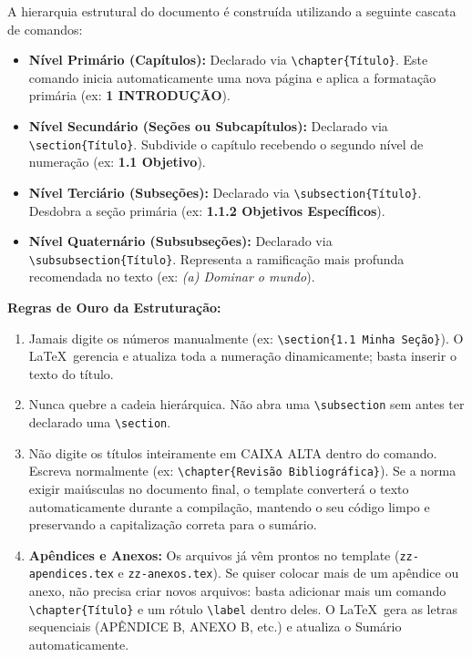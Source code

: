 \documentclass[a4paper,12pt]{article}
\begin{document}
A hierarquia estrutural do documento é construída utilizando a seguinte cascata de comandos:

\begin{itemize}
    \item \textbf{Nível Primário (Capítulos):} Declarado via \texttt{\textbackslash chapter\{Título\}}. Este comando inicia automaticamente uma nova página e aplica a formatação primária (ex: \textbf{1 INTRODUÇÃO}).
    \item \textbf{Nível Secundário (Seções ou Subcapítulos):} Declarado via \texttt{\textbackslash section\{Título\}}. Subdivide o capítulo recebendo o segundo nível de numeração (ex: \textbf{1.1 Objetivo}).
    \item \textbf{Nível Terciário (Subseções):} Declarado via \texttt{\textbackslash subsection\{Título\}}. Desdobra a seção primária (ex: \textbf{1.1.2 Objetivos Específicos}).
    \item \textbf{Nível Quaternário (Subsubseções):} Declarado via \texttt{\textbackslash subsubsection\{Título\}}. Representa a ramificação mais profunda recomendada no texto (ex: \textit{(a) Dominar o mundo}).
\end{itemize}

\textbf{Regras de Ouro da Estruturação:}
\begin{enumerate}
    \item Jamais digite os números manualmente (ex: \texttt{\textbackslash section\{1.1 Minha Seção\}}). O \LaTeX \ gerencia e atualiza toda a numeração dinamicamente; basta inserir o texto do título.
    \item Nunca quebre a cadeia hierárquica. Não abra uma \texttt{\textbackslash subsection} sem antes ter declarado uma \texttt{\textbackslash section}.
    \item Não digite os títulos inteiramente em CAIXA ALTA dentro do comando. Escreva normalmente (ex: \texttt{\textbackslash chapter\{Revisão Bibliográfica\}}). Se a norma exigir maiúsculas no documento final, o template converterá o texto automaticamente durante a compilação, mantendo o seu código limpo e preservando a capitalização correta para o sumário.
    \item \textbf{Apêndices e Anexos:} Os arquivos já vêm prontos no template (\texttt{zz-apendices.tex} e \texttt{zz-anexos.tex}). Se quiser colocar mais de um apêndice ou anexo, não precisa criar novos arquivos: basta adicionar mais um comando \texttt{\textbackslash chapter\{Título\}} e um rótulo \texttt{\textbackslash label} dentro deles. O \LaTeX \ gera as letras sequenciais (APÊNDICE B, ANEXO B, etc.) e atualiza o Sumário automaticamente.
\end{enumerate}
\end{document}
